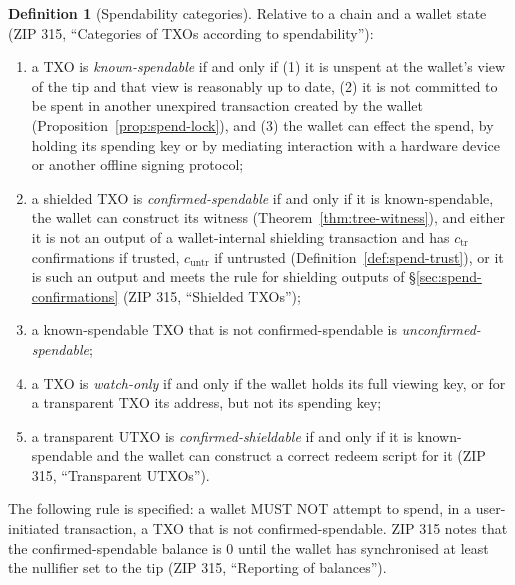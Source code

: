\documentclass[11pt,a4paper]{article}
\theoremstyle{definition}
\newtheorem{definition}[theorem]{Definition}
\begin{document}
\begin{definition}[Spendability categories]\label{def:spend-categories}
Relative to a chain and a wallet state (ZIP 315, ``Categories of TXOs
according to spendability''):
\begin{enumerate}[label=(\roman*)]
\item a TXO is \emph{known-spendable} if and only if (1) it is unspent at the
  wallet's view of the tip and that view is reasonably up to date, (2) it is
  not committed to be spent in another unexpired transaction created by the
  wallet (Proposition~\ref{prop:spend-lock}), and (3) the wallet can effect
  the spend, by holding its spending key or by mediating interaction with a
  hardware device or another offline signing protocol;
\item a shielded TXO is \emph{confirmed-spendable} if and only if it is
  known-spendable, the wallet can construct its witness
  (Theorem~\ref{thm:tree-witness}), and either it is not an output of a
  wallet-internal shielding transaction and has $c_{\mathrm{tr}}$
  confirmations if trusted, $c_{\mathrm{untr}}$ if untrusted
  (Definition~\ref{def:spend-trust}), or it is such an output and meets the
  rule for shielding outputs of \S\ref{sec:spend-confirmations} (ZIP 315,
  ``Shielded TXOs'');
\item a known-spendable TXO that is not confirmed-spendable is
  \emph{unconfirmed-spendable};
\item a TXO is \emph{watch-only} if and only if the wallet holds its full
  viewing key, or for a transparent TXO its address, but not its spending
  key;
\item a transparent UTXO is \emph{confirmed-shieldable} if and only if it is
  known-spendable and the wallet can construct a correct redeem script for it
  (ZIP 315, ``Transparent UTXOs'').
\end{enumerate}
The following rule is specified: a wallet MUST NOT attempt to spend, in a
user-initiated transaction, a TXO that is not confirmed-spendable. ZIP 315
notes that the confirmed-spendable balance is $0$ until the wallet has
synchronised at least the nullifier set to the tip (ZIP 315, ``Reporting of
balances'').
\end{definition}
\end{document}
